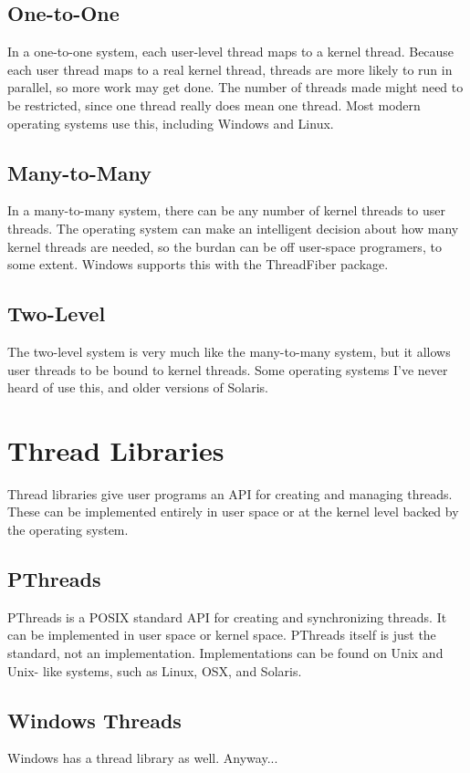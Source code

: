 \documentclass{article}
\begin{document}
\subsection{One-to-One}
In a one-to-one system, each user-level thread maps to a kernel thread. Because
each user thread maps to a real kernel thread, threads are more likely to run
in parallel, so more work may get done. The number of threads made might need
to be restricted, since one thread really does mean one thread. Most modern
operating systems use this, including Windows and Linux.

\subsection{Many-to-Many}
In a many-to-many system, there can be any number of kernel threads to user
threads. The operating system can make an intelligent decision about how many
kernel threads are needed, so the burdan can be off user-space programers, to
some extent. Windows supports this with the ThreadFiber package.

\subsection{Two-Level}
The two-level system is very much like the many-to-many system, but it allows
user threads to be bound to kernel threads. Some operating systems I've never
heard of use this, and older versions of Solaris.

\section{Thread Libraries}
Thread libraries give user programs an API for creating and managing threads.
These can be implemented entirely in user space or at the kernel level backed
by the operating system.

\subsection{PThreads}
PThreads is a POSIX standard API for creating and synchronizing threads. It can
be implemented in user space or kernel space. PThreads itself is just the
standard, not an implementation. Implementations can be found on Unix and Unix-
like systems, such as Linux, OSX, and Solaris.

\subsection{Windows Threads}
Windows has a thread library as well. Anyway...
\end{document}

